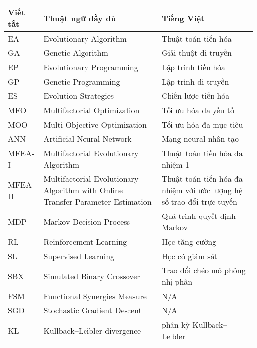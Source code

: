 \fontsize{12}{16}\selectfont

\begin{center}
\begin{tabular}{|l|p{2in} | p{2in}|}

\hline
\textbf{Viết tắt} & \textbf{Thuật ngữ đầy đủ} & \textbf{Tiếng Việt} \\ \hline
    EA & Evolutionary Algorithm & Thuật toán tiến hóa\\ \hline
    GA & Genetic Algorithm & Giải thuật di truyền\\ \hline
    EP & Evolutionary Programming & Lập trình tiến hóa \\ \hline
    GP & Genetic Programming & Lập trình di truyền\\ \hline
    ES & Evolution Strategies & Chiến lược tiến hóa\\ \hline
    
    MFO & Multifactorial Optimization & Tối ưu hóa đa yếu tố  \\ \hline
    MOO & Multi Objective Optimization & Tối ưu hóa đa mục tiêu\\ \hline
     
    ANN & Artificial Neural Network & Mạng neural nhân tạo\\ \hline
    MFEA-I & Multifactorial Evolutionary Algorithm  & Thuật toán tiến hóa đa nhiệm 1\\ \hline
    MFEA-II & Multifactorial Evolutionary Algorithm with Online Transfer Parameter Estimation & Thuật toán tiến hóa đa nhiệm với ước lượng hệ số trao đổi trực tuyến\\ \hline
    MDP & Markov Decision Process & Quá trình quyết định Markov\\ \hline
     
    RL & Reinforcement Learning & Học tăng cường\\ \hline
    SL & Supervised Learning & Học có giám sát\\ \hline
     
    SBX & Simulated Binary Crossover & Trao đổi chéo mô phỏng nhị phân\\ \hline
     
    FSM & Functional Synergies Measure &  N/A\\ \hline
    SGD & Stochastic Gradient Descent & N/A\\ \hline
    KL & Kullback–Leibler divergence & phân kỳ Kullback–Leibler\\ \hline
\end{tabular}    
\end{center}
\pagebreak